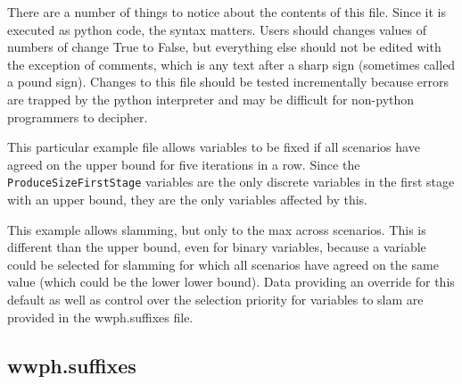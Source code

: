 There are a number of things to notice about the contents of this file. Since it
is executed as python code, the syntax matters. Users should changes values of
numbers of change True to False, but everything else should not be edited with
the exception of comments, which is any text after a sharp sign (sometimes
called a pound sign). Changes to this file should be tested incrementally
because errors are trapped by the python interpreter and may be difficult for
non-python programmers to decipher.

This particular example file allows variables to be fixed if all scenarios have
agreed on the upper bound for five iterations in a row. Since the
\verb|ProduceSizeFirstStage| variables are the only discrete variables in the
first stage with an upper bound, they are the only variables affected by this.

This example allows slamming, but only to the max across scenarios. This is
different than the upper bound, even for binary variables, because a variable
could be selected for slamming for which all scenarios have agreed on the same
value (which could be the lower lower bound). Data providing an override for
this default as well as control over the selection priority for variables to
slam are provided in the wwph.suffixes file.

\subsection{wwph.suffixes}

